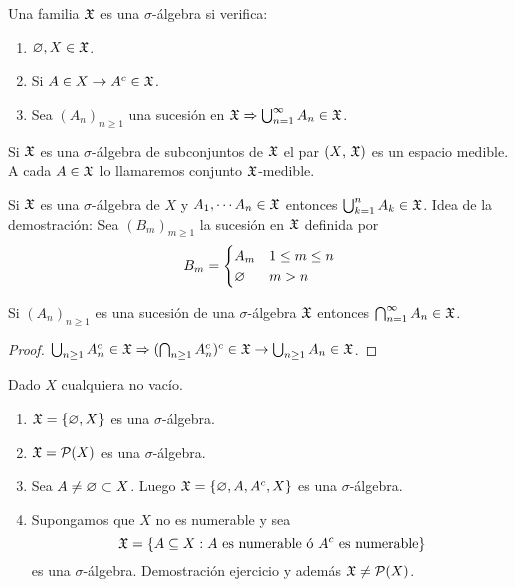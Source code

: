 \begin{definition}
    Una familia $\mathfrak{X}$ es una $\sigma$-álgebra si verifica:
    \begin{enumerate}
        \item $\varnothing, X \in \mathfrak{X}$.
        \item Si $A \in X \to A^c \in \mathfrak{X}$.
        \item Sea $(A_n)_{n \geq 1}$ una sucesión en $\mathfrak{X} \Rightarrow \bigcup_{n=1}^{\infty} A_n \in \mathfrak{X}$.
    \end{enumerate}
\end{definition}

\begin{definition}
    Si $\mathfrak{X}$ es una $\sigma$-álgebra de subconjuntos de $\mathfrak{X}$ el par $(X\text{, }\mathfrak{X})$ es un espacio medible. A cada $A \in \mathfrak{X}$
    lo llamaremos conjunto $\mathfrak{X}$-medible.
\end{definition}

\begin{note}
    Si $\mathfrak{X}$ es una $\sigma$-álgebra de $X$ y $A_1, \cdots A_n \in \mathfrak{X}$ entonces $\bigcup_{k=1}^{n} A_k \in \mathfrak{X}$.
    Idea de la demostración: Sea $(B_m)_{m \geq 1}$ la sucesión en $\mathfrak{X}$ definida por \begin{equation*}
        B_m = \begin{cases}
            A_m & 1 \leq m \leq n \\
            \varnothing  & m > n
        \end{cases}
    \end{equation*}
\end{note}

\begin{note}
    Si $(A_n)_{n \geq 1}$ es una sucesión de una $\sigma$-álgebra $\mathfrak{X}$ entonces $\bigcap_{n=1}^{\infty} A_n \in \mathfrak{X}$.
    \begin{proof}
        $\bigcup_{n \geq 1} A_n^c \in \mathfrak{X} \Rightarrow (\bigcap_{n \geq 1} A_n^c)^c \in \mathfrak{X} \to \bigcup_{n \geq 1} A_n \in \mathfrak{X}$.
    \end{proof}
\end{note}

\begin{eg}
    Dado $X$ cualquiera no vacío.
    \begin{enumerate}
        \item $\mathfrak{X} = \{ \varnothing, X \}$ es una $\sigma$-álgebra.
        \item $\mathfrak{X} = \mathcal{P}(X)$ es una $\sigma$-álgebra.
        \item Sea $A \neq \varnothing \subset X$. Luego $\mathfrak{X} = \{ \varnothing, A, A^c, X \}$ es una $\sigma$-álgebra.
        \item Supongamos que $X$ no es numerable y sea
              \begin{equation*}
                  \mathfrak{X} = \{ A \subseteq X : A \text{ es numerable ó } A^c \text{ es numerable} \}
              \end{equation*}
              es una $\sigma$-álgebra. Demostración ejercicio y además $\mathfrak{X} \neq \mathcal{P}(X)$.
    \end{enumerate}
\end{eg}

